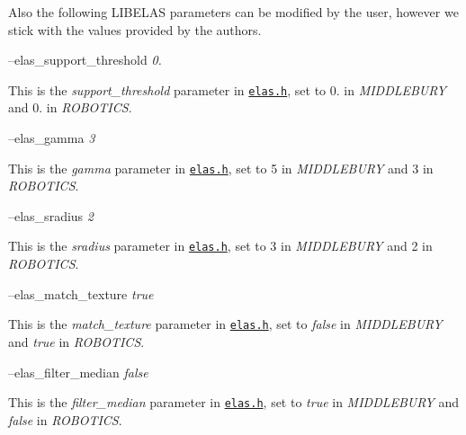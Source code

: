 Also the following L\+I\+B\+E\+L\+A\+S parameters can be modified by the user, however we stick with the values provided by the authors.

--elas\+\_\+support\+\_\+threshold {\itshape 0.} 
\begin{DoxyItemize}
\item This is the {\itshape support\+\_\+threshold} parameter in \href{https://github.com/robotology/stereo-vision/tree/master/lib/elas/include/elas.h}{\tt elas.\+h}, set to 0. in {\itshape M\+I\+D\+D\+L\+E\+B\+U\+R\+Y} and 0. in {\itshape R\+O\+B\+O\+T\+I\+C\+S}.
\end{DoxyItemize}

--elas\+\_\+gamma {\itshape 3} 
\begin{DoxyItemize}
\item This is the {\itshape gamma} parameter in \href{https://github.com/robotology/stereo-vision/tree/master/lib/elas/include/elas.h}{\tt elas.\+h}, set to 5 in {\itshape M\+I\+D\+D\+L\+E\+B\+U\+R\+Y} and 3 in {\itshape R\+O\+B\+O\+T\+I\+C\+S}.
\end{DoxyItemize}

--elas\+\_\+sradius {\itshape 2} 
\begin{DoxyItemize}
\item This is the {\itshape sradius} parameter in \href{https://github.com/robotology/stereo-vision/tree/master/lib/elas/include/elas.h}{\tt elas.\+h}, set to 3 in {\itshape M\+I\+D\+D\+L\+E\+B\+U\+R\+Y} and 2 in {\itshape R\+O\+B\+O\+T\+I\+C\+S}.
\end{DoxyItemize}

--elas\+\_\+match\+\_\+texture {\itshape true} 
\begin{DoxyItemize}
\item This is the {\itshape match\+\_\+texture} parameter in \href{https://github.com/robotology/stereo-vision/tree/master/lib/elas/include/elas.h}{\tt elas.\+h}, set to {\itshape false} in {\itshape M\+I\+D\+D\+L\+E\+B\+U\+R\+Y} and {\itshape true} in {\itshape R\+O\+B\+O\+T\+I\+C\+S}.
\end{DoxyItemize}

--elas\+\_\+filter\+\_\+median {\itshape false} 
\begin{DoxyItemize}
\item This is the {\itshape filter\+\_\+median} parameter in \href{https://github.com/robotology/stereo-vision/tree/master/lib/elas/include/elas.h}{\tt elas.\+h}, set to {\itshape true} in {\itshape M\+I\+D\+D\+L\+E\+B\+U\+R\+Y} and {\itshape false} in {\itshape R\+O\+B\+O\+T\+I\+C\+S}.
\end{DoxyItemize}

